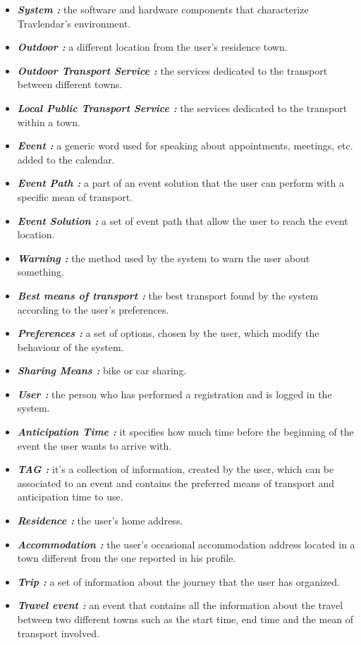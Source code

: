 \newpage
{}
\begin{itemize}
	\setlength{\leftskip}{0.5cm}
	\item \emph{\textbf{System : }}the software and hardware components that characterize Travlendar’s environment.
	\item \emph{\textbf{Outdoor : }}a different location from the user’s residence town.
	\item \emph{\textbf{Outdoor Transport Service : }}the services dedicated to the transport between different towns.
	\item \emph{\textbf{Local Public Transport Service : }}the services dedicated to the transport within a town.
	\item \emph{\textbf{Event : }}a generic word used for speaking about appointments, meetings, etc. added to the calendar.
	\item \emph{\textbf{Event Path : }}a part of an event solution that the user can perform with a specific mean of transport.
	\item \emph{\textbf{Event Solution : }}a set of event path that allow the user to reach the event location.
	\item \emph{\textbf{Warning : }}the method used by the system to warn the user about something.
	\item \emph{\textbf{Best means of transport : }}the best transport found by the system according to the user’s preferences.
	\item \emph{\textbf{Preferences : }}a set of options, chosen by the user, which modify the behaviour of the system.
	\item \emph{\textbf{Sharing Means : }}bike or car sharing.
	\item \emph{\textbf{User : }}the person who has performed a registration and is logged in the system.
	\item \emph{\textbf{Anticipation Time : }}it specifies how much time before the beginning of the event the user wants to arrive with.
	\item \emph{\textbf{TAG : }}it’s a collection of information, created by the user, which can be associated to an event and contains the preferred means of transport and anticipation time to use.
	\item \emph{\textbf{Residence : }}the user’s home address.
	\item \emph{\textbf{Accommodation : }}the user’s occasional accommodation address located in a town different from the one reported in his profile.
	\item \emph{\textbf{Trip : }}a set of information about the journey that the user has organized.
	\item \emph{\textbf{Travel event : }}an event that contains all the information about the travel between two different towns such as the start time, end time and the mean of transport involved.
\end{itemize}

